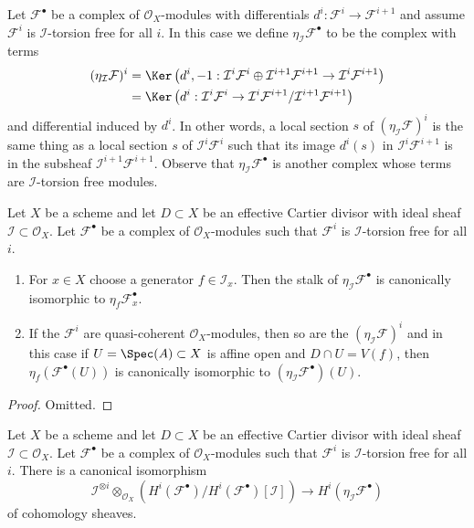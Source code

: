 \medskip\noindent
Let $\mathcal{F}^\bullet$ be a complex of $\mathcal{O}_X$-modules with
differentials $d^i : \mathcal{F}^i \to \mathcal{F}^{i + 1}$
and assume $\mathcal{F}^i$ is $\mathcal{I}$-torsion free for all $i$.
In this case we define $\eta_\mathcal{I}\mathcal{F}^\bullet$
to be the complex with terms
\begin{align*}
(\eta_\mathcal{I}\mathcal{F})^i
& =
\Ker\left(
d^i, -1 :
\mathcal{I}^i\mathcal{F}^i \oplus \mathcal{I}^{i + 1}\mathcal{F}^{i + 1}
\to
\mathcal{I}^i\mathcal{F}^{i + 1}
\right) \\
& =
\Ker\left(d^i :
\mathcal{I}^i\mathcal{F}^i
\to
\mathcal{I}^i\mathcal{F}^{i + 1}/
\mathcal{I}^{i + 1}\mathcal{F}^{i + 1}
\right)
\end{align*}
and differential induced by $d^i$. In other words, a local section
$s$ of $(\eta_\mathcal{I}\mathcal{F})^i$ is the same thing as a local section
$s$ of $\mathcal{I}^i\mathcal{F}^i$ such that its image $d^i(s)$
in $\mathcal{I}^i\mathcal{F}^{i + 1}$ is in the subsheaf
$\mathcal{I}^{i + 1}\mathcal{F}^{i + 1}$.
Observe that $\eta_\mathcal{I}\mathcal{F}^\bullet$
is another complex whose terms are $\mathcal{I}$-torsion free modules.

\begin{lemma}
\label{lemma-eta-stalks}
Let $X$ be a scheme and let $D \subset X$ be an effective Cartier divisor
with ideal sheaf $\mathcal{I} \subset \mathcal{O}_X$.
Let $\mathcal{F}^\bullet$ be a complex of $\mathcal{O}_X$-modules
such that $\mathcal{F}^i$ is $\mathcal{I}$-torsion free for all $i$.
\begin{enumerate}
\item For $x \in X$ choose a generator $f \in \mathcal{I}_x$. Then
the stalk of $\eta_\mathcal{I}\mathcal{F}^\bullet$ is canonically
isomorphic to $\eta_f\mathcal{F}^\bullet_x$.
\item If the $\mathcal{F}^i$ are quasi-coherent $\mathcal{O}_X$-modules,
then so are the $(\eta_\mathcal{I}\mathcal{F})^i$ and in this case
if $U = \Spec(A) \subset X$ is affine open and $D \cap U = V(f)$,
then $\eta_f(\mathcal{F}^\bullet(U))$ is canonically isomorphic
to $(\eta_\mathcal{I}\mathcal{F}^\bullet)(U)$.
\end{enumerate}
\end{lemma}

\begin{proof}
Omitted.
\end{proof}

\begin{lemma}
\label{lemma-eta-first-property}
Let $X$ be a scheme and let $D \subset X$ be an effective Cartier divisor
with ideal sheaf $\mathcal{I} \subset \mathcal{O}_X$.
Let $\mathcal{F}^\bullet$ be a complex of $\mathcal{O}_X$-modules
such that $\mathcal{F}^i$ is $\mathcal{I}$-torsion free for all $i$.
There is a canonical isomorphism
$$
\mathcal{I}^{\otimes i} \otimes_{\mathcal{O}_X}
\left(
H^i(\mathcal{F}^\bullet)/H^i(\mathcal{F}^\bullet)[\mathcal{I}]
\right)
\longrightarrow H^i(\eta_\mathcal{I}\mathcal{F}^\bullet)
$$
of cohomology sheaves.
\end{lemma}

